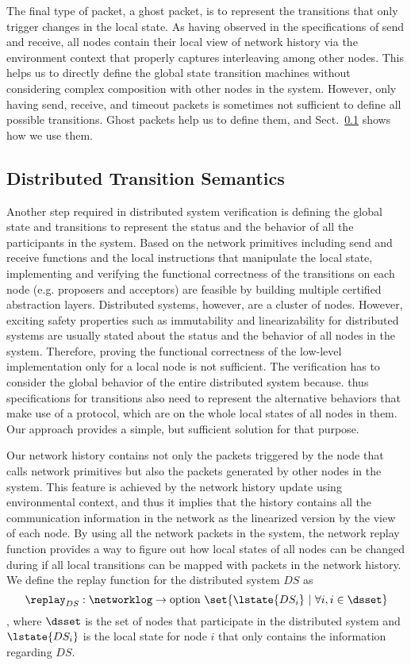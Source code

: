 The final type of packet, a ghost packet, is to represent the transitions that only trigger changes in the local state.
As having observed in the specifications of send and receive,
all nodes contain their local view of network history 
via the environment context that properly captures interleaving among other nodes.
This helps us to directly define the global state transition machines without considering complex composition with other nodes in the system. 
However, only having send, receive, and timeout packets is sometimes not sufficient
to define all possible transitions.
Ghost packets help us to define them, and Sect.~\ref{subsec:distributed-transition-semantics} shows how we use them.

\subsection{Distributed Transition Semantics}
\label{subsec:distributed-transition-semantics}

Another step required in distributed system verification is defining the global state and transitions to represent the status and the behavior of 
all the participants in the system.
Based on the network primitives including send and receive functions and the local
instructions that manipulate the local state,
implementing and verifying the functional correctness of the transitions on each node
(e.g. proposers and acceptors) are feasible by building multiple certified abstraction layers. 
Distributed systems, however, are a cluster of nodes.
However, exciting safety properties such as immutability and linearizability for distributed systems are usually stated about the status and the behavior of all nodes in the system. 
Therefore, proving the functional correctness of the low-level implementation only for a local node is not sufficient.
The verification has to consider the global behavior of the entire distributed system because.
thus specifications for transitions also need to represent the alternative behaviors that make use of a protocol,
which are on the whole local states of all nodes in them. 
Our approach provides a simple, but sufficient solution for that purpose. 


Our network history contains not only the packets triggered by the node that calls network primitives but also 
the packets generated by other nodes in the system.
This feature is achieved by the network history update using environmental context,
and thus it implies that the history contains all the communication information in the network as the linearized version by the view of each node.
By using all the network packets in the system, 
the network replay function provides a way to figure out how local states of all nodes can be changed during if all local transitions can be mapped with packets in the network history.
We define the
replay function for the distributed system $DS$ as
$$\replay_{DS}: \networklog \rightarrow \mbox{option}\ \set{\lstate{DS_i}~\vert~\forall i, i \in \dsset} $$
, where $\dsset$ is the set of nodes that participate in the distributed system and
$\lstate{DS_i}$ is the local state for node $i$ that only contains the information
regarding $DS$. 
 
